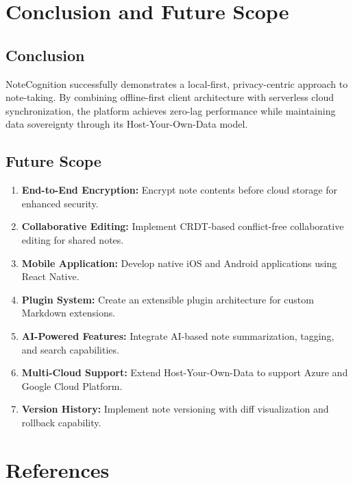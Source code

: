 \documentclass[12pt, a4paper, oneside]{report}
\begin{document}
\chapter{Conclusion and Future Scope}

\section{Conclusion}
NoteCognition successfully demonstrates a local-first, privacy-centric approach to note-taking. By combining offline-first client architecture with serverless cloud synchronization, the platform achieves zero-lag performance while maintaining data sovereignty through its Host-Your-Own-Data model.

\section{Future Scope}
\begin{enumerate}
    \item \textbf{End-to-End Encryption:} Encrypt note contents before cloud storage for enhanced security.
    \item \textbf{Collaborative Editing:} Implement CRDT-based conflict-free collaborative editing for shared notes.
    \item \textbf{Mobile Application:} Develop native iOS and Android applications using React Native.
    \item \textbf{Plugin System:} Create an extensible plugin architecture for custom Markdown extensions.
    \item \textbf{AI-Powered Features:} Integrate AI-based note summarization, tagging, and search capabilities.
    \item \textbf{Multi-Cloud Support:} Extend Host-Your-Own-Data to support Azure and Google Cloud Platform.
    \item \textbf{Version History:} Implement note versioning with diff visualization and rollback capability.
\end{enumerate}


\chapter*{References}
\end{document}
